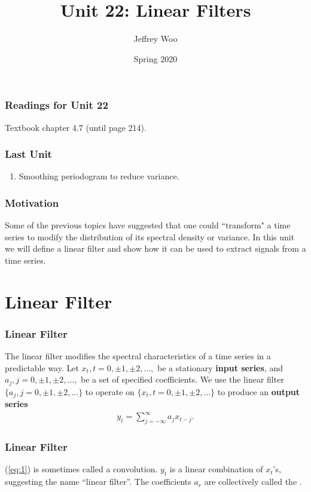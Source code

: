 \documentclass[%
xcolor=pdftex]{beamer}
\title{Unit 22: Linear Filters}
\author[STAT 5170: Applied Time Series, Unit 24]{Jeffrey Woo}
\institute{Department of Statistics, University of Virginia}
\date{Spring 2020}
\begin{document}
\frame{\titlepage}


\begin{frame}
\frametitle{Readings for Unit 22}

Textbook chapter 4.7 (until page 214).

\end{frame}


\begin{frame}
\frametitle{Last Unit}
\begin{enumerate}
\item Smoothing periodogram to reduce variance.
\end{enumerate}
\end{frame}

\begin{frame}
\frametitle{Motivation}

Some of the previous topics have suggested that one could ``transform" a time series to modify the distribution of its spectral density or variance. In this unit we will define a linear filter and show how it can be used to extract signals from a time series.


\end{frame}

\section{Linear Filter}
\frame{\tableofcontents[currentsection]}

\begin{frame}
\frametitle{Linear Filter}

The linear filter modifies the spectral characteristics of a time series in a predictable way. Let  $x_t,t=0,\pm 1,\pm 2,\ldots,$ be a stationary \textbf{input
series}, and $a_j,j=0,\pm 1,\pm 2,\ldots,$ be a set of specified
coefficients. We use the linear filter $\{a_j,j=0,\pm 1, \pm
2,\ldots\}$ to operate on $\{x_t,t=0,\pm 1, \pm 2,\ldots\}$ to
produce an \textbf{output series}
\begin{eqnarray}\label{eq:1}
y_t = \sum^\infty_{j=-\infty} a_j x_{t-j}.
\end{eqnarray}



\end{frame}

\begin{frame}
\frametitle{Linear Filter}

(\ref{eq:1}) is sometimes called a convolution.  $y_t$ is a linear combination of $x_t$'s, suggesting the
name ``linear filter''. The coefficients $a_r$ are collectively
called the \underline{\hspace{45 mm}}.

\end{frame}
\end{document}
